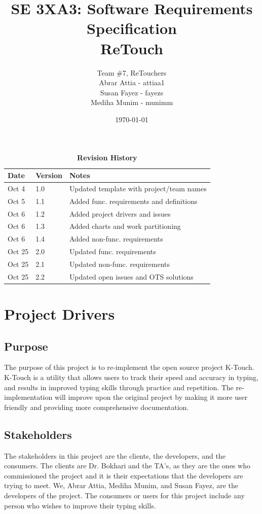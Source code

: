\documentclass[12pt, titlepage]{article}
\title{SE 3XA3: Software Requirements Specification\\ReTouch}
\author{Team \#7, ReTouchers
		\\ Abrar Attia - attiaa1
		\\ Susan Fayez - fayezs
		\\ Mediha Munim - munimm
}
\date{\today}
\begin{document}
\maketitle

\tableofcontents
\listoftables
\listoffigures

\begin{table}[bp]
\caption{\bf Revision History}
\begin{tabularx}{\textwidth}{p{3cm}p{2cm}X}
\toprule {\bf Date} & {\bf Version} & {\bf Notes}\\
\midrule
Oct 4 & 1.0 & Updated template with project/team names\\
Oct 5 & 1.1 & Added func. requirements and definitions \\
Oct 6 & 1.2 & Added project drivers and issues\\
Oct 6 & 1.3 & Added charts and work partitioning\\
Oct 6 & 1.4 & Added non-func. requirements \\
Oct 25 & 2.0 & Updated func. requirements \\
Oct 25 & 2.1 & Updated non-func. requirements \\
Oct 25 & 2.2 & Updated open issues and OTS solutions\\
\bottomrule
\end{tabularx}
\end{table}

\newpage


\section{Project Drivers}
\subsection{Purpose}
\indent \indent The purpose of this project is to re-implement the open source project K-Touch. K-Touch is a utility that allows users to track their speed and accuracy in typing, and results in improved typing skills through practice and repetition. The re-implementation will improve upon the original project by making it more user friendly and providing more comprehensive documentation.

\subsection{Stakeholders}
\indent \indent The stakeholders in this project are the clients, the developers, and the consumers. The clients are Dr. Bokhari and the TA's, as they are the ones who commissioned the project and it is their expectations that the developers are trying to meet. We, Abrar Attia, Mediha Munim, and Susan Fayez, are the developers of the project. The consumers or users for this project include any person who wishes to improve their typing skills.
\end{document}
